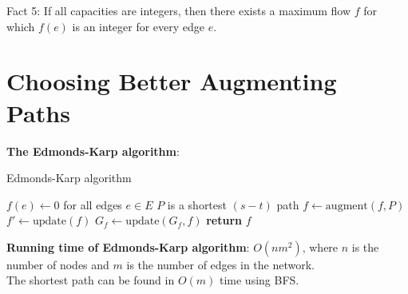 \documentclass[onecolumn]{report}
\begin{document}
Fact 5: If all capacities are integers, then there exists a maximum flow $f$ for which $f(e)$ is an integer for every edge $e$.\\


\section{Choosing Better Augmenting Paths}
\textbf{The Edmonds-Karp algorithm}:\\
\begin{algorithm}[H]
\caption{Edmonds-Karp algorithm}
\begin{algorithmic}[1]
        \State $f(e) \gets 0$ for all edges $e\in E$
            \State $P$ is a shortest $(s-t)$ path
            \State $f \gets \text{augment}(f,P)$
            \State $f' \gets \text{update} (f)$
            \State $G_f \gets \text{update}(G_f,f)$
        \EndWhile
        \State \textbf{return} $f$
    \EndProcedure
\end{algorithmic}
\end{algorithm}
\noindent
\textbf{Running time of Edmonds-Karp algorithm}: $O(nm^2)$, where $n$ is the number of nodes and $m$ is the number of edges in the network.\\
The shortest path can be found in $O(m)$ time using BFS.\\
\end{document}
